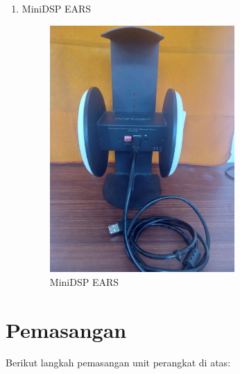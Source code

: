 \documentclass[12pt]{book}
\begin{document}
\begin{enumerate}
        \item MiniDSP EARS
         \begin{figure}[!ht]
			\centering
			\includegraphics[width=200pt,angle=-90]{images/unit/ears}
			\caption{MiniDSP EARS}
		\end{figure}

     \end{enumerate}

    \section{Pemasangan}

	Berikut langkah pemasangan unit perangkat di atas:
\end{document}
